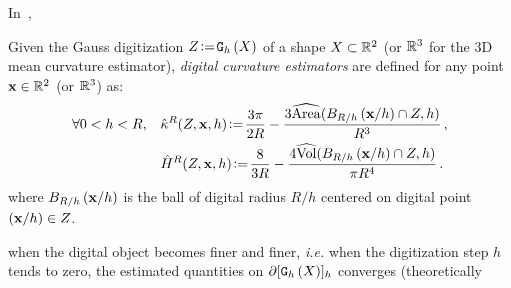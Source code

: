 \documentclass{llncs}
\newcommand{\ie}{\emph{i.e.}\xspace}
\newcommand{\Jaco}[1]{{\color{orange}#1}}
\begin{document}
In~\cite{DGCI2013}, 
%
\begin{Definition}
  Given the Gauss digitization $Z\!\mathrel{\mathop:}=\!\mathtt{G}_{h}\left(X\right)$ of a shape $X \subset {\mathbb{R}}^2$
  (or ${\mathbb{R}}^3$ for the 3D mean curvature estimator), \emph{digital curvature
  estimators} are defined for any point $\mathbf{x} \in {\mathbb{R}}^2$ (or ${\mathbb{R}}^3$) as:
  \vspace{-0.05cm}
  \begin{align}
    \forall 0 < h < R,\quad
    &\hat{\kappa}^{R}(Z,\mathbf{x},h) \!\mathrel{\mathop:}=\! \frac{3\pi}{2R}
    - \frac{3\widehat{\mathrm{Area}}(B_{R/h}\left(\mathbf{x}/h\right) \cap
    {Z}, h)}{R^3}\,,\label{eq:dig-curvature-estimator-k}\\
    &\hat{H}^{R}(Z,\mathbf{x},h) \!\mathrel{\mathop:}=\! \frac{8}{3R}
    - \frac{4\widehat{\mathrm{Vol}}(B_{R/h}\left(\mathbf{x}/h\right) \cap
    Z, h)}{\pi R^4}\,.\label{eq:dig-curvature-estimator-H}
  \end{align}
  where $B_{R/h}\left(\mathbf{x}/h\right)$ is the ball of digital radius $R/h$ centered on
  digital point $(\mathbf{x}/h) \in Z$.
\end{Definition}
%
 when the digital object becomes finer
and finer, \ie when the digitization step $h$ tends to zero, the
estimated quantities on $\partial \lbrack \mathtt{G}_{h}\left(X\right) \rbrack_{h}$ converges (theoretically
\end{document}
